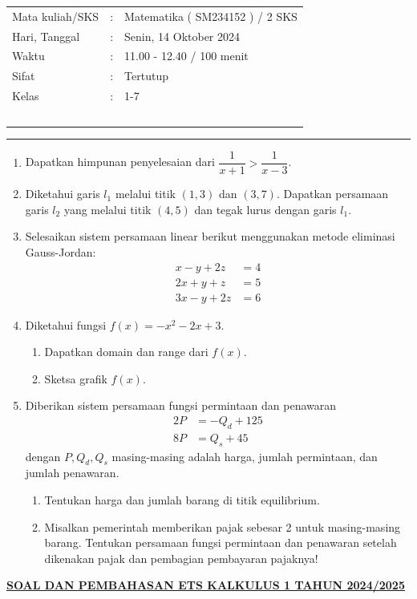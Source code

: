 \documentclass[10pt,openany,a4paper]{article}
\theoremstyle{definition}
\theoremstyle{definition}
\theoremstyle{plain}
\begin{document}
    \begin{center}
	\begin{tabular}{lcl}
		Mata kuliah/SKS & : & Matematika ( SM234152 ) / 2 SKS\\
		Hari, Tanggal & : & Senin, 14 Oktober 2024\\
		Waktu & : & 11.00 - 12.40 / 100 menit\\
		Sifat & : & Tertutup\\
		Kelas & : & 1-7\\
  ~
	\end{tabular}

    \noindent\rule{\textwidth}{2.pt}
        \end{center}
\begin{enumerate}
    \item Dapatkan himpunan penyelesaian dari $\dfrac{1}{x+1}>\dfrac{1}{x-3}$.

    \item Diketahui garis $l_1$ melalui titik $(1,3)$ dan $(3,7)$. Dapatkan persamaan garis $l_2$ yang melalui titik $(4,5)$ dan tegak lurus dengan garis $l_1$.

    \item Selesaikan sistem persamaan linear berikut menggunakan metode eliminasi Gauss-Jordan:
    \begin{align*}
        x-y+2z &= 4\\
        2x+y+z &= 5\\
        3x-y+2z &= 6
    \end{align*}

    \item Diketahui fungsi $f(x)=-x^2-2x+3$.
    \begin{enumerate}
        \item Dapatkan domain dan range dari $f(x)$.
        \item Sketsa grafik $f(x)$.
    \end{enumerate}

    \item Diberikan sistem persamaan fungsi permintaan dan penawaran
    \begin{align*}
        2P &= -Q_d+125\\
        8P &= Q_s+45
    \end{align*}
    dengan $P,Q_d,Q_s$ masing-masing adalah harga, jumlah permintaan, dan jumlah penawaran.
    \begin{enumerate}
        \item Tentukan harga dan jumlah barang di titik equilibrium.
        \item Misalkan pemerintah memberikan pajak sebesar 2 untuk masing-masing barang. Tentukan persamaan fungsi permintaan dan penawaran setelah dikenakan pajak dan pembagian pembayaran pajaknya!
    \end{enumerate}
\end{enumerate}
\newpage
 \begin{center}
	{\underline{\textbf{\MakeUppercase{Soal dan Pembahasan ETS Kalkulus 1 Tahun 2024/2025}}}}
    \end{center}
\end{document}

